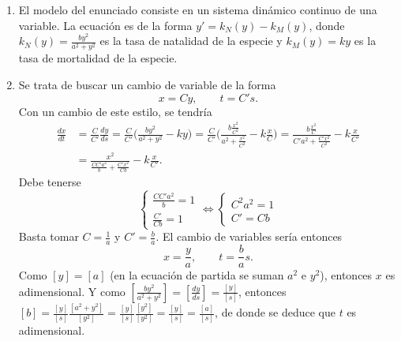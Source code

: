 \documentclass[11pt]{report}
\begin{document}
\begin{solution}
    \hfill
    \begin{enumerate}
        \item El modelo del enunciado consiste en un sistema dinámico continuo de una variable. La ecuación es de la forma $y' = k_N(y)-k_M(y)$, donde $k_N(y) = \frac{by^2}{a^2+y^2}$ es la tasa de natalidad de la especie y $k_M(y) = ky$ es la tasa de mortalidad de la especie. 
        \item Se trata de buscar un cambio de variable de la forma
        \[x = Cy, \qquad t = C's.\]
        Con un cambio de este estilo, se tendría
        \begin{align*}
            \frac{dx}{dt} &= \frac{C}{C'}\frac{dy}{ds} = \frac{C}{C'}\bigl(\frac{by^2}{a^2+y^2}-ky\bigr) =  \frac{C}{C'}\bigl(\frac{b\frac{x^2}{C^2}}{a^2+\frac{x^2}{C^2}}-k\frac{x}{C}\bigr) =  \frac{b\frac{x^2}{C}}{C'a^2+\frac{C'x^2}{C^2}}-k\frac{x}{C'} \\
            &= \frac{x^2}{\frac{CC'a^2}{b}+\frac{C'x^2}{Cb}}-k\frac{x}{C'}.
        \end{align*}
        Debe tenerse
        \[\begin{cases}
            \frac{CC'a^2}{b} = 1 \\
            \frac{C'}{Cb} = 1 
        \end{cases} \iff \begin{cases}
            C^2a^2 = 1 \\
            C' = Cb
        \end{cases}\]
        Basta tomar $C = \frac{1}{a}$ y $C' = \frac{b}{a}$. El cambio de variables sería entonces
        \[x = \frac{y}{a}, \qquad t = \frac{b}{a}s.\]
        Como $[y] = [a]$ (en la ecuación de partida se suman $a^2$ e $y^2$), entonces $x$ es adimensional. Y como $[\frac{by^2}{a^2+y^2}] = [\frac{dy}{ds}] = \frac{[y]}{[s]}$, entonces $[b] = \frac{[y]}{[s]}\frac{[a^2+y^2]}{[y^2]} = \frac{[y]}{[s]}\frac{[y^2]}{[y^2]} = \frac{[y]}{[s]} = \frac{[a]}{[s]}$, de donde se deduce que $t$ es adimensional.


\end{enumerate}
\end{solution}
\end{document}
